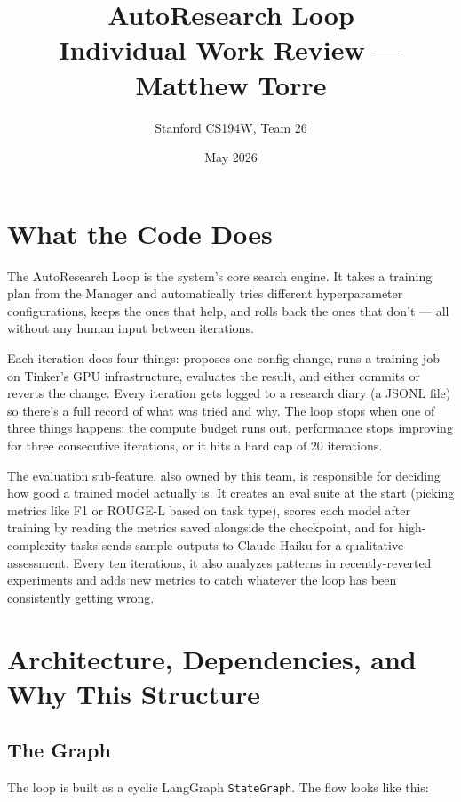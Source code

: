\documentclass[11pt,letterpaper]{article}
\title{\textbf{AutoResearch Loop}\\
\large Individual Work Review --- Matthew Torre}
\author{Stanford CS194W, Team 26}
\date{May 2026}
\begin{document}
\maketitle

\section{What the Code Does}

The AutoResearch Loop is the system's core search engine. It takes a training plan from the Manager and automatically tries different hyperparameter configurations, keeps the ones that help, and rolls back the ones that don't --- all without any human input between iterations.

Each iteration does four things: proposes one config change, runs a training job on Tinker's GPU infrastructure, evaluates the result, and either commits or reverts the change. Every iteration gets logged to a research diary (a JSONL file) so there's a full record of what was tried and why. The loop stops when one of three things happens: the compute budget runs out, performance stops improving for three consecutive iterations, or it hits a hard cap of 20 iterations.

The evaluation sub-feature, also owned by this team, is responsible for deciding how good a trained model actually is. It creates an eval suite at the start (picking metrics like F1 or ROUGE-L based on task type), scores each model after training by reading the metrics saved alongside the checkpoint, and for high-complexity tasks sends sample outputs to Claude Haiku for a qualitative assessment. Every ten iterations, it also analyzes patterns in recently-reverted experiments and adds new metrics to catch whatever the loop has been consistently getting wrong.

\section{Architecture, Dependencies, and Why This Structure}

\subsection{The Graph}

The loop is built as a cyclic LangGraph \texttt{StateGraph}. The flow looks like this:
\end{document}
